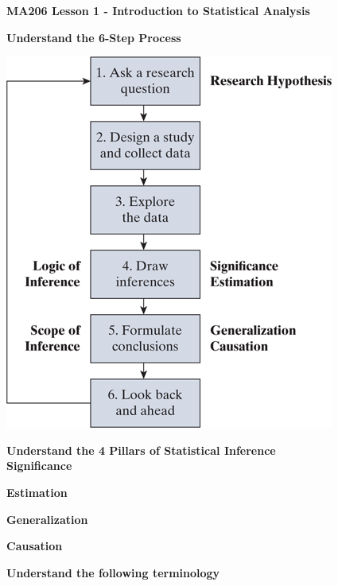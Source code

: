 \documentclass{article}
\newif\ifPrintSolution
\newcommand{\sol}[1]{\ifPrintSolution {\color{blue} #1 } \fi}
\begin{document}
\noindent \textbf{MA206 Lesson 1 - Introduction to Statistical Analysis}
\vspace{.1in}

\textbf{Understand the 6-Step Process}

\includegraphics[scale=0.6]{6_Step_Process.png}

\vspace{0.25in}

\textbf{Understand the 4 Pillars of Statistical Inference}\\

\hspace{0.1in} \textbf{Significance}

\vfill
\sol{How \textbf{Strong} is the evidence of an effect?}

\hspace{0.1in} \textbf{Estimation}

\vfill
\sol{What is the \textbf{size} of the effect?}

\hspace{0.1in} \textbf{Generalization}

\vfill
\sol{How \textbf{broadly} do the conclusions apply?}

\hspace{0.1in} \textbf{Causation}

\vfill
\sol{Can we say what \textbf{caused} the observed difference?}


\vspace{0.2in}
\textbf{Understand the following terminology}
\end{document}
